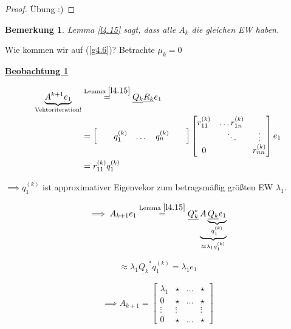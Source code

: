 \documentclass{book}
\newtheorem{remark}[algorithm]{Bemerkung}
\begin{document}
            \begin{proof}
            Übung :)
            \end{proof}

            \begin{remark}\label{b4.16}
                Lemma \ref{l4.15} sagt, dass alle $A_k$ die gleichen EW haben. 
            \end{remark}

            Wie kommen wir auf (\ref{g4.6})? Betrachte $\mu_k=0$

            \underline{\textbf{Beobachtung 1}} 

            \begin{align*}
                \underbrace{A^{k+1}e_1}_{\text{Vektoriteration!}}&\stackrel{\text{Lemma }\ref{l4.15}}{=} \underline{Q_k}\underline{R_k}e_1\\
                &=\begin{bmatrix}
                    &&
                    q_1^{(k)} & \dots& q_n^{(k)}
                    &&
                \end{bmatrix}
                \begin{bmatrix}
                    r_{11}^{(k)} &  \dots r_{1n}^{(k)}\\
                    &\ddots  &\vdots \\
                    0 && r_{nn}^{(k)}
                \end{bmatrix}
                e_1\\
                &=r_{11}^{(k)}q_1^{(k)}
            \end{align*}

            $\implies q_1^{(k)}$ ist approximativer Eigenvekor zum betragsmäßig größten EW $\lambda_1$.

            $$\implies A_{k+1}e_1\stackrel{\text{Lemma }\ref{l4.15}}{=} \underline{Q_k^*}\underbrace{A\underbrace{\underline{Q_k}e_1}_{q_1^{(k)}}}_{\approx \lambda_1 q_1^{(k)}}$$

            \[\approx \lambda_1\underline{Q_k}^*q_1^{(k)}=\lambda_1e_1\]

            \[\implies A_{k+1}=\begin{bmatrix}
                \lambda_1 & \star & \dots & \star\\
                0& \star & \dots & \star\\
                \vdots & \vdots &&\vdots \\
                0 &  \star& \dots & \star
            \end{bmatrix}\]
\end{document}
